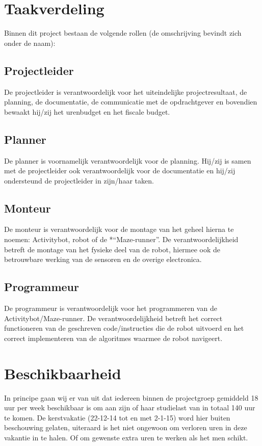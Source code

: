 \documentclass[oneside]{book}
\begin{document}
\section{Taakverdeling}
Binnen dit project bestaan de volgende rollen (de omschrijving bevindt zich onder de naam):
\subsection*{Projectleider}
De projectleider is verantwoordelijk voor het uiteindelijke projectresultaat, de planning, de
documentatie, de communicatie met de opdrachtgever en bovendien bewaakt hij/zij het urenbudget
en het fiscale budget.
\subsection*{Planner}
De planner is voornamelijk verantwoordelijk voor de planning.
Hij/zij is samen met de projectleider ook verantwoordelijk voor de documentatie en hij/zij
ondersteund de projectleider in zijn/haar taken.
\subsection*{Monteur}
De monteur is verantwoordelijk voor de montage van het geheel hierna te noemen: Activitybot,
robot of de *“Maze-runner”.
De verantwoordelijkheid betreft de montage van het fysieke deel van de robot, hiermee ook de
betrouwbare werking van de sensoren en de overige electronica.
\subsection*{Programmeur}
De programmeur is verantwoordelijk voor het programmeren van de Activitybot/Maze-runner.
De verantwoordelijkheid betreft het correct functioneren van de geschreven code/instructies die de
robot uitvoerd en het correct implementeren van de algoritmes waarmee de robot navigeert.

\section{Beschikbaarheid}
In principe gaan wij er van uit dat iedereen binnen de projectgroep gemiddeld 18 uur per week
beschikbaar is om aan zijn of haar studielast van in totaal 140 uur te komen.
De kerstvakatie (22-12-14 tot en met 2-1-15) word hier buiten beschouwing gelaten, uiteraard is het
niet ongewoon om verloren uren in deze vakantie in te halen.
Of om gewenste extra uren te werken als het men schikt.
\end{document}
